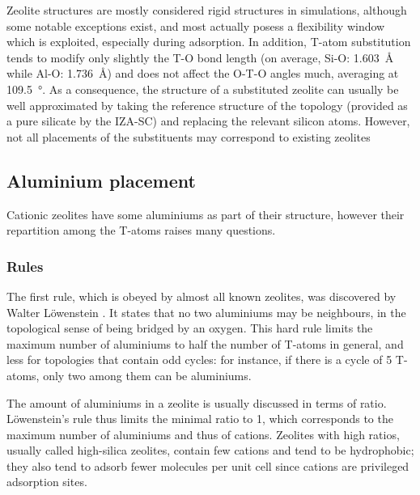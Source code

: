 \documentclass[main.tex]{subfiles}
\begin{document}
Zeolite structures are mostly considered rigid structures in simulations, although some notable exceptions exist\autocite{RHOFlexibility,MFIFlexibility}, and most actually posess a flexibility window\autocite{ZeoliteFlexibility} which is exploited, especially during adsorption\autocite{ZeoliteInducedFlexibility}. In addition, T-atom substitution tends to modify only slightly the T-O bond length (on average, Si-O: \qty{1.603}{\angstrom} while Al-O: \qty{1.736}{\angstrom}) and does not affect the O-T-O angles much, averaging at \qty{109.5}{\degree}\autocite{ZeoliteBondAngles}. As a consequence, the structure of a substituted zeolite can usually be well approximated by taking the reference structure of the topology (provided as a pure silicate by the IZA-SC) and replacing the relevant silicon atoms. However, not all placements of the substituents may correspond to existing zeolites

\subsection{Aluminium placement}

Cationic zeolites have some aluminiums as part of their structure, however their repartition among the T-atoms raises many questions.

\subsubsection{Rules}

The first rule, which is obeyed by almost all known zeolites, was discovered by Walter L\"owenstein \cite{Loewenstein}. It states that no two aluminiums may be neighbours, in the topological sense of being bridged by an oxygen. This hard rule limits the maximum number of aluminiums to half the number of T-atoms in general, and less for topologies that contain odd cycles: for instance, if there is a cycle of 5 T-atoms, only two among them can be aluminiums.

The amount of aluminiums in a zeolite is usually discussed in terms of \SiAl ratio. L\"owenstein's rule thus limits the minimal \SiAl ratio to 1, which corresponds to the maximum number of aluminiums and thus of cations. Zeolites with high \SiAl ratios, usually called high-silica zeolites, contain few cations and tend to be hydrophobic; they also tend to adsorb fewer molecules per unit cell since cations are privileged adsorption sites.
\end{document}

